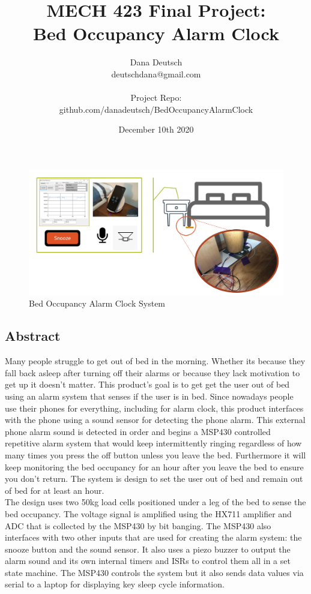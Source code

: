 \documentclass[11pt]{article}
\title{\vspace{-2cm} \textbf{MECH 423 Final Project: \\
		Bed Occupancy Alarm Clock}}
\author{Dana Deutsch \\
		deutschdana@gmail.com\\
		\\
		Project Repo:\\
		 github.com/danadeutsch/BedOccupancyAlarmClock
	}
\date{December 10th 2020}
\begin{document}
\maketitle
\begin{figure}[H]
	\centering
	\includegraphics[width = 0.8\linewidth]{systemImage}
	\caption{Bed Occupancy Alarm Clock System}
	\label{fig:representative}
\end{figure}
\subsection*{Abstract}
Many people struggle to get out of bed in the morning. 
Whether its because they fall back asleep after turning off their alarms or because they lack motivation to get up it doesn't matter.
This product's goal is to get get the user out of bed using an alarm system that senses if the user is in bed.
Since nowadays people use their phones for everything, including for alarm clock, this product interfaces with the phone using a sound sensor for detecting the phone alarm.
This external phone alarm sound is detected in order and begins a MSP430 controlled repetitive alarm system that would keep intermittently ringing regardless of how many times you press the off button unless you leave the bed.
Furthermore it will keep monitoring the bed occupancy for an hour after you leave the bed to ensure you don't return.
The system is design to set the user out of bed and remain out of bed for at least an hour.\\

The design uses two 50kg load cells positioned under a leg of the bed to sense the bed occupancy.
The voltage signal is amplified using the HX711 amplifier and ADC that is collected by the MSP430 by bit banging.
The MSP430 also interfaces with two other inputs that are used for creating the alarm system: the snooze button and the sound sensor.
It also uses a piezo buzzer to output the alarm sound and its own internal timers and ISRs to control them all in a set state machine. 
The MSP430 controls the system but it also sends data values via serial to a laptop for displaying key sleep cycle information. 
  
\end{document}
